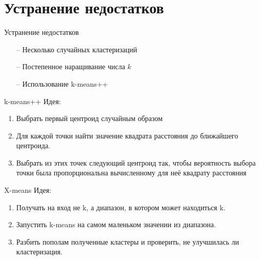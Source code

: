 \documentclass[10pt]{beamer}
\begin{document}
\section{Устранение недостатков}

\begin{frame}{Устранение недостатков}
	\begin{itemize} [<+- | alert@+>]
		\item[--] Несколько случайных кластеризаций
		\item[--] Постепенное наращивание числа $k$
		\item[--] Использование k-means++
	\end{itemize}
\end{frame}

\begin{frame}{k-means++}
	\alert{Идея}:\\
	\begin{enumerate}
		\item Выбрать первый центроид случайным образом
		\item Для каждой точки найти значение квадрата расстояния до ближайшего центроида.
		\item Выбрать из этих точек следующий центроид так, чтобы вероятность выбора точки была пропорциональна вычисленному для неё квадрату расстояния
	\end{enumerate}
\end{frame}

{
\begin{frame}{X-means}
	\alert{Идея}:\\
	\begin{enumerate}
		\item Получать на вход не k, а диапазон, в котором может находиться k.
		\item Запустить k-means на самом маленьком значении из диапазона.
		\item Разбить пополам полученные кластеры и проверить, не улучшилась ли кластеризация.
	\end{enumerate}
\end{frame}
}

\end{document}
